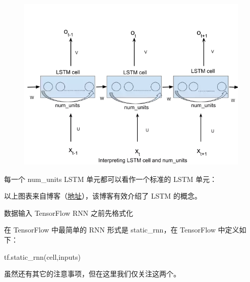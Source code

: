 \documentclass{article}
\begin{document}
\begin{figure}[H]
	\includegraphics[scale=0.5]{lstm_unit.png}
\end{figure}
每一个 num\_units LSTM 单元都可以看作一个标准的 LSTM 单元：


以上图表来自博客（\href{http://colah.github.io/posts/2015-08-Understanding-LSTMs/}{地址}），该博客有效介绍了 LSTM 的概念。

数据输入 TensorFlow RNN 之前先格式化

在 TensorFlow 中最简单的 RNN 形式是 static\_rnn，在 TensorFlow 中定义如下：

tf.static\_rnn(cell,inputs)


虽然还有其它的注意事项，但在这里我们仅关注这两个。
\end{document}
